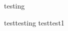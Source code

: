 \documentclass{article}
\begin{document}
\lipsum[1]
\def\testa{\leavevmode test\ignorespaces  }

\test testing  \test 

\testa testing  \testa test1
\end{document}
